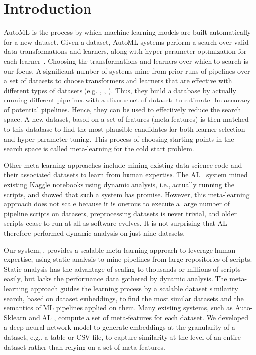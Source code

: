 \section{Introduction}
\label{introduction}

AutoML is the process by which machine learning models are built automatically for a new dataset. Given a dataset, AutoML systems perform a search over valid data transformations and learners, along with hyper-parameter optimization for each learner~\cite{VolcanoML}. Choosing the transformations and learners over which to search is our focus.
A significant number of systems mine from prior runs of pipelines over a set of datasets to choose transformers and learners that are effective with different types of datasets (e.g. \cite{NEURIPS2018_b59a51a3}, \cite{10.14778/3415478.3415542}, \cite{autosklearn}). Thus, they build a database by actually running different pipelines with a diverse set of datasets to estimate the accuracy of potential pipelines. Hence, they can be used to effectively reduce the search space. A new dataset, based on a set of features (meta-features) is then matched to this database to find the most plausible candidates for both learner selection and hyper-parameter tuning. This process of choosing starting points in the search space is called meta-learning for the cold start problem.  

Other meta-learning approaches include mining existing data science code and their associated datasets to learn from human expertise. The AL~\cite{al} system mined existing Kaggle notebooks using dynamic analysis, i.e., actually running the scripts, and showed that such a system has promise.  However, this meta-learning approach does not scale because it is onerous to execute a large number of pipeline scripts on datasets, preprocessing datasets is never trivial, and older scripts cease to run at all as software evolves. It is not surprising that AL therefore performed dynamic analysis on just nine datasets.

Our system, {\sysname}, provides a scalable meta-learning approach to leverage human expertise, using static analysis to mine pipelines from large repositories of scripts. Static analysis has the advantage of scaling to thousands or millions of scripts \cite{graph4code} easily, but lacks the performance data gathered by dynamic analysis. The {\sysname} meta-learning approach guides the learning process by a scalable dataset similarity search, based on dataset embeddings, to find the most similar datasets and the semantics of ML pipelines applied on them.  Many existing systems, such as Auto-Sklearn \cite{autosklearn} and AL \cite{al}, compute a set of meta-features for each dataset. We developed a deep neural network model to generate embeddings at the granularity of a dataset, e.g., a table or CSV file, to capture similarity at the level of an entire dataset rather than relying on a set of meta-features.
 
